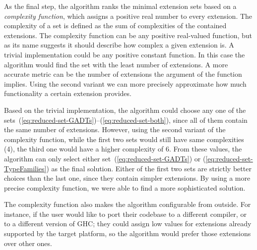 \documentclass[main.tex]{subfiles}
\begin{document}
	As the final step, the algorithm ranks the minimal extension sets based on a \emph{complexity function}, which assigns a positive real number to every extension. The complexity of a set is defined as the sum of complexities of the contained extensions. The complexity function can be any positive real-valued function, but as its name suggests it should describe how complex a given extension is. A trivial implementation could be any positive constant function. In this case the algorithm would find the set with the least number of extensions. A more accurate metric can be the number of extensions the argument of the function implies. Using the second variant we can more precisely approximate how much functionality a certain extension provides.
	
	Based on the trivial implementation, the algorithm could choose any one of the sets~(\ref{eq:reduced-set-GADTs})--(\ref{eq:reduced-set-both}), since all of them contain the same number of extensions. However, using the second variant of the complexity function, while the first two sets would still have same complexities (4), the third one would have a higher complexity of 6. From these values, the algorithm can only select either set~(\ref{eq:reduced-set-GADTs}) or (\ref{eq:reduced-set-TypeFamilies}) as the final solution. Either of the first two sets are strictly better choices than the last one, since they contain simpler extensions. By using a more precise complexity function, we were able to find a more sophisticated solution.
	
	The complexity function also makes the algorithm configurable from outside. For instance, if the user would like to port their codebase to a different compiler, or to a different version of GHC; they could assign low values for extensions already supported by the target platform, so the algorithm would prefer those extensions over other ones.
		
\end{document}

